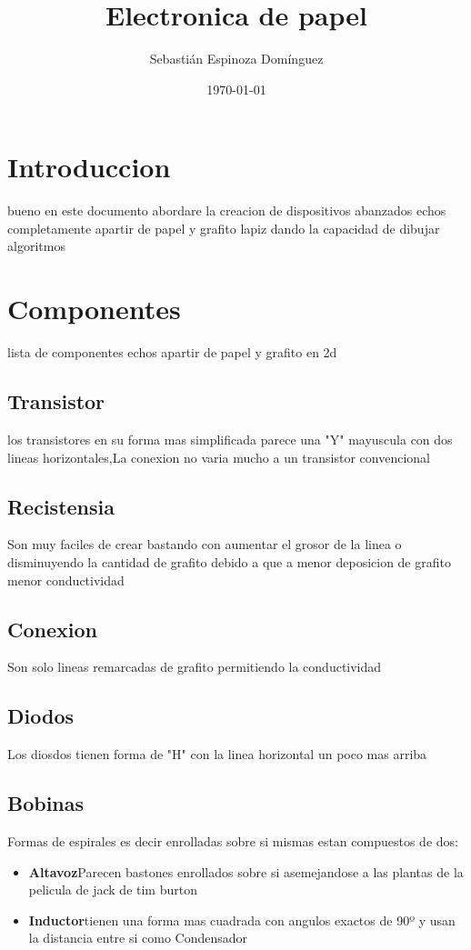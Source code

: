 \documentclass[]{article}
\title{Electronica de papel}
\author{Sebastián Espinoza Domínguez}
\date{\today}
\begin{document}
\maketitle

\section{Introduccion}
bueno en este documento abordare la creacion de dispositivos 
abanzados echos completamente apartir de papel y grafito
lapiz dando la capacidad de dibujar algoritmos

\section{Componentes}
lista de componentes echos apartir de papel y grafito en 2d
\subsection{Transistor}
los transistores en su forma mas simplificada parece una "Y"
mayuscula con dos lineas horizontales,La conexion no varia mucho
a un transistor convencional
\subsection{Recistensia}
Son muy faciles de crear bastando con aumentar el grosor de la linea
o disminuyendo la cantidad de grafito debido a que a 
menor deposicion de grafito menor conductividad
\subsection{Conexion}
Son solo lineas remarcadas de grafito permitiendo la conductividad
\subsection{Diodos}Los diosdos tienen forma de "H" con la linea 
horizontal un poco mas arriba
\subsection{Bobinas}Formas de espirales es decir enrolladas sobre
si mismas estan compuestos de dos:
\begin{itemize}
    \item \textbf{Altavoz}Parecen bastones enrollados sobre si
    asemejandose a las plantas de la pelicula de jack de 
    tim burton
    \item \textbf{Inductor}tienen una forma mas cuadrada con 
    angulos exactos de 90º y usan la distancia entre si como
    Condensador
\end{itemize}
\end{document}
